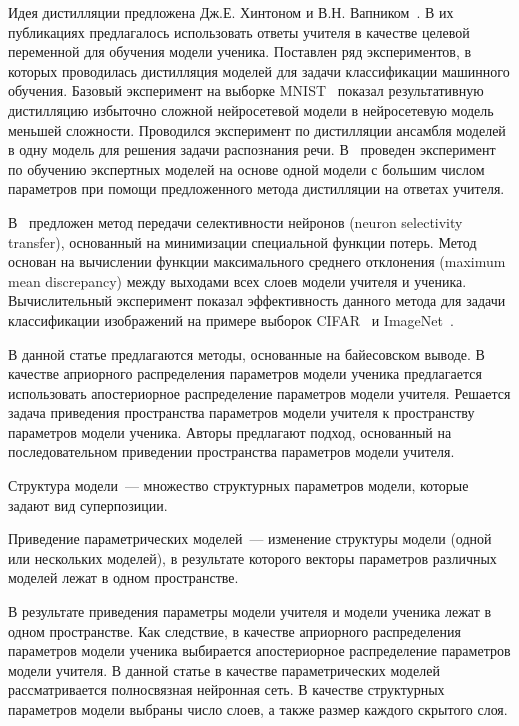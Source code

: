 \documentclass[12pt]{a&t}
\begin{document}
Идея дистилляции предложена Дж.Е. Хинтоном и В.Н. Вапником~\cite{Hinton2015, Vapnik2015, Lopez2016}. В их публикациях предлагалось использовать ответы учителя в качестве целевой переменной для обучения модели ученика.
Поставлен ряд экспериментов, в которых проводилась дистилляция моделей для задачи классификации машинного обучения.
Базовый эксперимент на выборке MNIST~\cite{mnist} показал результативную дистилляцию избыточно сложной нейросетевой модели в нейросетевую модель меньшей сложности.
Проводился эксперимент по дистилляции ансамбля моделей в одну модель для решения задачи распознания речи. В~\cite{Hinton2015} проведен эксперимент по обучению экспертных моделей на основе одной модели с большим числом параметров при помощи предложенного метода дистилляции на ответах учителя.

В~\cite{Zehao2017} предложен метод передачи селективности нейронов (neuron selectivity transfer), основанный на минимизации специальной функции потерь.
Метод основан на вычислении функции максимального среднего отклонения (maximum mean discrepancy) между выходами всех слоев модели учителя и ученика. Вычислительный эксперимент показал эффективность данного метода для задачи классификации изображений на примере выборок CIFAR~\cite{cifar10} и ImageNet~\cite{imagenet}.

В данной статье предлагаются методы, основанные на байесовском выводе.
В качестве априорного распределения параметров модели ученика предлагается использовать апостериорное распределение параметров модели учителя.
Решается задача приведения пространства параметров модели учителя к пространству параметров модели ученика.
Авторы предлагают подход, основанный на последовательном приведении пространства параметров модели учителя. 
\begin{definition}
\label{def:structure}
Структура модели~--- множество структурных параметров модели, которые задают вид суперпозиции.
\end{definition}
\begin{definition}
\label{def:sopos}
Приведение параметрических моделей~--- изменение структуры модели {\normalfont (}одной или нескольких моделей{\normalfont )}, в результате которого векторы параметров различных моделей лежат в одном пространстве.
\end{definition}

В результате приведения параметры модели учителя и модели ученика лежат в одном пространстве.
Как следствие, в качестве априорного распределения параметров модели ученика выбирается апостериорное распределение параметров модели учителя.
В данной статье в качестве параметрических моделей рассматривается полносвязная нейронная сеть.
В качестве структурных параметров модели выбраны число слоев, а также размер каждого скрытого слоя.
\end{document}
